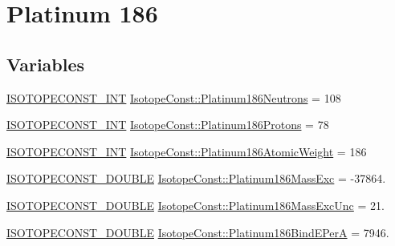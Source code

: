 \hypertarget{group___isotope_const-_platinum-_pt186}{}\section{Platinum 186}
\label{group___isotope_const-_platinum-_pt186}
\subsection*{Variables}
\begin{DoxyCompactItemize}
\item 
\mbox{\hyperlink{group___isotope_const-_macros_ga5f18360b3e99483a35c32d789e62621c}{I\+S\+O\+T\+O\+P\+E\+C\+O\+N\+S\+T\+\_\+\+I\+NT}} \mbox{\hyperlink{group___isotope_const-_platinum-_pt186_gac2a6771d9c5a1fe94c99924d7aef4a3f}{Isotope\+Const\+::\+Platinum186\+Neutrons}} = 108
\item 
\mbox{\hyperlink{group___isotope_const-_macros_ga5f18360b3e99483a35c32d789e62621c}{I\+S\+O\+T\+O\+P\+E\+C\+O\+N\+S\+T\+\_\+\+I\+NT}} \mbox{\hyperlink{group___isotope_const-_platinum-_pt186_ga98bd07ce6eaf301d20f062ba8fc770b6}{Isotope\+Const\+::\+Platinum186\+Protons}} = 78
\item 
\mbox{\hyperlink{group___isotope_const-_macros_ga5f18360b3e99483a35c32d789e62621c}{I\+S\+O\+T\+O\+P\+E\+C\+O\+N\+S\+T\+\_\+\+I\+NT}} \mbox{\hyperlink{group___isotope_const-_platinum-_pt186_ga734c099451eeefc39f6fffa269dec7d7}{Isotope\+Const\+::\+Platinum186\+Atomic\+Weight}} = 186
\item 
\mbox{\hyperlink{group___isotope_const-_macros_ga8f45a7272ce02c0b4c65c44636ed719a}{I\+S\+O\+T\+O\+P\+E\+C\+O\+N\+S\+T\+\_\+\+D\+O\+U\+B\+LE}} \mbox{\hyperlink{group___isotope_const-_platinum-_pt186_ga0f1ff8989df855a3de21a63bb32865ed}{Isotope\+Const\+::\+Platinum186\+Mass\+Exc}} = -\/37864.
\item 
\mbox{\hyperlink{group___isotope_const-_macros_ga8f45a7272ce02c0b4c65c44636ed719a}{I\+S\+O\+T\+O\+P\+E\+C\+O\+N\+S\+T\+\_\+\+D\+O\+U\+B\+LE}} \mbox{\hyperlink{group___isotope_const-_platinum-_pt186_gae32e64ddffc525b4e724ac89f3064cbb}{Isotope\+Const\+::\+Platinum186\+Mass\+Exc\+Unc}} = 21.
\item 
\mbox{\hyperlink{group___isotope_const-_macros_ga8f45a7272ce02c0b4c65c44636ed719a}{I\+S\+O\+T\+O\+P\+E\+C\+O\+N\+S\+T\+\_\+\+D\+O\+U\+B\+LE}} \mbox{\hyperlink{group___isotope_const-_platinum-_pt186_ga71cfddf2596fa64a1018b220fec9d070}{Isotope\+Const\+::\+Platinum186\+Bind\+E\+PerA}} = 7946.
\item 

\end{DoxyCompactItemize}
